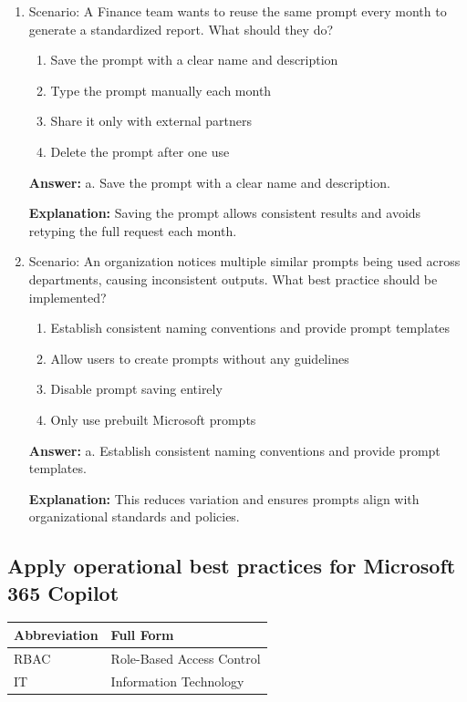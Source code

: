 \documentclass[10pt]{article}
\begin{document}
\begin{enumerate}[leftmargin=*]
\textbf{Answer:} True.

\textbf{Explanation:} This approach ensures Microsoft 365 permissions enforce access and reduces the risk of data exposure.

\item Scenario: A Finance team wants to reuse the same prompt every month to generate a standardized report. What should they do?
\begin{enumerate}[label=\alph*., leftmargin=1.5em]
\item Save the prompt with a clear name and description
\item Type the prompt manually each month
\item Share it only with external partners
\item Delete the prompt after one use
\end{enumerate}
\textbf{Answer:} a. Save the prompt with a clear name and description.

\textbf{Explanation:} Saving the prompt allows consistent results and avoids retyping the full request each month.

\item Scenario: An organization notices multiple similar prompts being used across departments, causing inconsistent outputs. What best practice should be implemented?
\begin{enumerate}[label=\alph*., leftmargin=1.5em]
\item Establish consistent naming conventions and provide prompt templates
\item Allow users to create prompts without any guidelines
\item Disable prompt saving entirely
\item Only use prebuilt Microsoft prompts
\end{enumerate}
\textbf{Answer:} a. Establish consistent naming conventions and provide prompt templates.

\textbf{Explanation:} This reduces variation and ensures prompts align with organizational standards and policies.

\end{enumerate}
\clearpage

\subsection{Apply operational best practices for Microsoft 365 Copilot}

\begin{center}
\begin{tabular}{>{\raggedright\arraybackslash}p{} >{\raggedright\arraybackslash}p{}}
\toprule
\textbf{Abbreviation} & \textbf{Full Form} \\
\midrule
RBAC & Role-Based Access Control \\
IT & Information Technology \\
\end{tabular}
\end{center}
\end{document}
